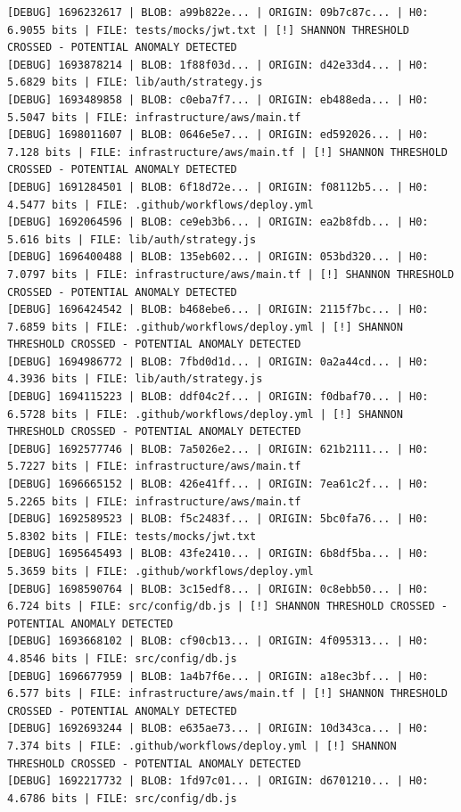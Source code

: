 \documentclass[12pt, a4paper, oneside]{report}
\begin{document}
\begin{lstlisting}[basicstyle=\tiny\ttfamily]
[DEBUG] 1696232617 | BLOB: a99b822e... | ORIGIN: 09b7c87c... | H0: 6.9055 bits | FILE: tests/mocks/jwt.txt | [!] SHANNON THRESHOLD CROSSED - POTENTIAL ANOMALY DETECTED
[DEBUG] 1693878214 | BLOB: 1f88f03d... | ORIGIN: d42e33d4... | H0: 5.6829 bits | FILE: lib/auth/strategy.js
[DEBUG] 1693489858 | BLOB: c0eba7f7... | ORIGIN: eb488eda... | H0: 5.5047 bits | FILE: infrastructure/aws/main.tf
[DEBUG] 1698011607 | BLOB: 0646e5e7... | ORIGIN: ed592026... | H0: 7.128 bits | FILE: infrastructure/aws/main.tf | [!] SHANNON THRESHOLD CROSSED - POTENTIAL ANOMALY DETECTED
[DEBUG] 1691284501 | BLOB: 6f18d72e... | ORIGIN: f08112b5... | H0: 4.5477 bits | FILE: .github/workflows/deploy.yml
[DEBUG] 1692064596 | BLOB: ce9eb3b6... | ORIGIN: ea2b8fdb... | H0: 5.616 bits | FILE: lib/auth/strategy.js
[DEBUG] 1696400488 | BLOB: 135eb602... | ORIGIN: 053bd320... | H0: 7.0797 bits | FILE: infrastructure/aws/main.tf | [!] SHANNON THRESHOLD CROSSED - POTENTIAL ANOMALY DETECTED
[DEBUG] 1696424542 | BLOB: b468ebe6... | ORIGIN: 2115f7bc... | H0: 7.6859 bits | FILE: .github/workflows/deploy.yml | [!] SHANNON THRESHOLD CROSSED - POTENTIAL ANOMALY DETECTED
[DEBUG] 1694986772 | BLOB: 7fbd0d1d... | ORIGIN: 0a2a44cd... | H0: 4.3936 bits | FILE: lib/auth/strategy.js
[DEBUG] 1694115223 | BLOB: ddf04c2f... | ORIGIN: f0dbaf70... | H0: 6.5728 bits | FILE: .github/workflows/deploy.yml | [!] SHANNON THRESHOLD CROSSED - POTENTIAL ANOMALY DETECTED
[DEBUG] 1692577746 | BLOB: 7a5026e2... | ORIGIN: 621b2111... | H0: 5.7227 bits | FILE: infrastructure/aws/main.tf
[DEBUG] 1696665152 | BLOB: 426e41ff... | ORIGIN: 7ea61c2f... | H0: 5.2265 bits | FILE: infrastructure/aws/main.tf
[DEBUG] 1692589523 | BLOB: f5c2483f... | ORIGIN: 5bc0fa76... | H0: 5.8302 bits | FILE: tests/mocks/jwt.txt
[DEBUG] 1695645493 | BLOB: 43fe2410... | ORIGIN: 6b8df5ba... | H0: 5.3659 bits | FILE: .github/workflows/deploy.yml
[DEBUG] 1698590764 | BLOB: 3c15edf8... | ORIGIN: 0c8ebb50... | H0: 6.724 bits | FILE: src/config/db.js | [!] SHANNON THRESHOLD CROSSED - POTENTIAL ANOMALY DETECTED
[DEBUG] 1693668102 | BLOB: cf90cb13... | ORIGIN: 4f095313... | H0: 4.8546 bits | FILE: src/config/db.js
[DEBUG] 1696677959 | BLOB: 1a4b7f6e... | ORIGIN: a18ec3bf... | H0: 6.577 bits | FILE: infrastructure/aws/main.tf | [!] SHANNON THRESHOLD CROSSED - POTENTIAL ANOMALY DETECTED
[DEBUG] 1692693244 | BLOB: e635ae73... | ORIGIN: 10d343ca... | H0: 7.374 bits | FILE: .github/workflows/deploy.yml | [!] SHANNON THRESHOLD CROSSED - POTENTIAL ANOMALY DETECTED
[DEBUG] 1692217732 | BLOB: 1fd97c01... | ORIGIN: d6701210... | H0: 4.6786 bits | FILE: src/config/db.js

\end{lstlisting}
\end{document}

